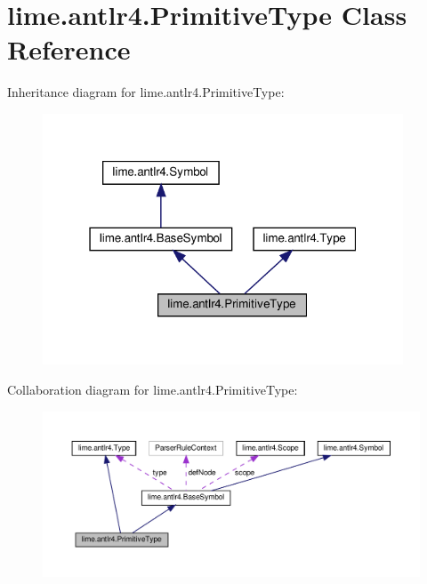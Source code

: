 \hypertarget{classlime_1_1antlr4_1_1PrimitiveType}{}\section{lime.\+antlr4.\+Primitive\+Type Class Reference}
\label{classlime_1_1antlr4_1_1PrimitiveType}


Inheritance diagram for lime.\+antlr4.\+Primitive\+Type\+:
\nopagebreak
\begin{figure}[H]
\begin{center}
\leavevmode
\includegraphics[width=304pt]{classlime_1_1antlr4_1_1PrimitiveType__inherit__graph}
\end{center}
\end{figure}


Collaboration diagram for lime.\+antlr4.\+Primitive\+Type\+:
\nopagebreak
\begin{figure}[H]
\begin{center}
\leavevmode
\includegraphics[width=350pt]{classlime_1_1antlr4_1_1PrimitiveType__coll__graph}
\end{center}
\end{figure}
